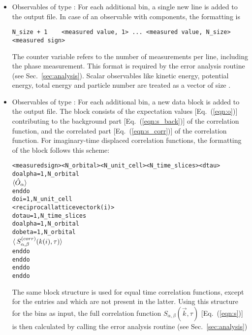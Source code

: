 \begin{itemize}
\item Observables of type :
For each additional bin, a single new line is added to the output file.
In case of an observable with  components, the formatting is 
\begin{verbatim}
N_size + 1    <measured value, 1> ... <measured value, N_size>    <measured sign>
\end{verbatim}
The counter variable  refers to the number of measurements per line, including the phase measurement. 
This format is required by the error analysis routine (see Sec.~\ref{sec:analysis}). 
Scalar observables like kinetic energy, potential energy, total energy and particle number are treated as a vector 
of size .

\item Observables of type :
For each additional bin, a new data block is added to the output file. 
The block consists of the expectation values [Eq.~(\ref{eqn:o})] contributing to the background part [Eq.~(\ref{eqn:s_back})] of the correlation function,
and the correlated part [Eq.~(\ref{eqn:s_corr})] of the correlation function.
For imaginary-time displaced correlation functions, the formatting of the block follows this scheme:
\begin{alltt}
<measured sign>  <N_orbital>  <N_unit_cell> <N_time_slices> <dtau>
do alpha = 1, N_orbital
    \(\langle\hat{O}\sb{\alpha}\rangle \)
enddo
do i = 1, N_unit_cell
   <reciprocal lattice vector k(i)>
   do tau = 1, N_time_slices
      do alpha = 1, N_orbital
         do beta = 1, N_orbital
            \(\langle\,S\sb{\alpha,\beta}\sp{(corr)}(k(i),\tau)\rangle\)
         enddo
      enddo
   enddo
enddo
\end{alltt}
The same block structure is used for equal time correlation functions, except for the entries   and  
which are not present in the latter.
Using this structure for the bins as input,
the full correlation function $S_{\alpha,\beta}(\vec{k},\tau)$ [Eq.~(\ref{eqn:s})] is then calculated by calling the error analysis routine (see Sec.~\ref{sec:analysis})
\end{itemize}

%
